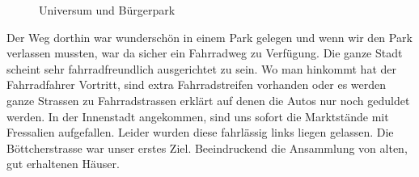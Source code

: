 \begin{figure}[H]
   \centering
   \quad
   \quad
   \caption[Universum und Bürgerpark]{Universum und Bürgerpark}
\end{figure}

Der Weg dorthin war wunderschön in einem Park gelegen und wenn wir den Park verlassen mussten, war da sicher ein Fahrradweg zu Verfügung.
Die ganze Stadt scheint sehr fahrradfreundlich ausgerichtet zu sein.
Wo man hinkommt hat der Fahrradfahrer Vortritt, sind extra Fahrradstreifen vorhanden oder es werden ganze Strassen zu Fahrradstrassen erklärt auf denen die Autos nur noch geduldet werden.
In der Innenstadt angekommen, sind uns sofort die Marktstände mit Fressalien aufgefallen. Leider wurden diese fahrlässig links liegen gelassen.
Die Böttcherstrasse war unser erstes Ziel. Beeindruckend die Ansammlung von alten, gut erhaltenen Häuser.

